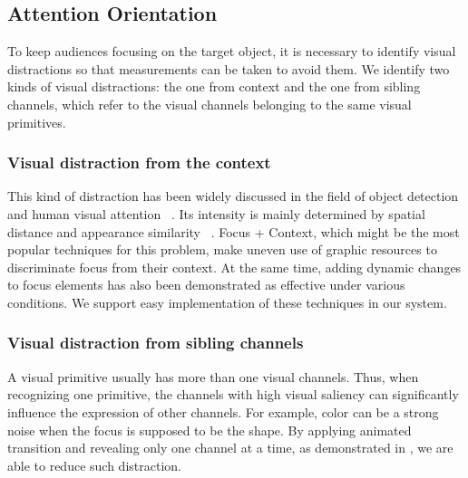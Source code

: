 \subsection{Attention Orientation}
To keep audiences focusing on the target object, it is necessary to identify visual distractions so that measurements can be taken to avoid them. 
We identify two kinds of visual distractions: the one from context and the one from sibling channels, which refer to the visual channels belonging to the same visual primitives. 

\subsubsection{Visual distraction from the context}
This kind of distraction has been widely discussed in the field of object detection and human visual attention ~\cite{nothdurft_salience_2000, standage_modelling_2005}. Its intensity is mainly  determined by spatial distance and appearance similarity ~\cite{wolfe_guided_1994}. 
Focus + Context, which might be the most popular techniques for this problem, make uneven use of graphic resources to discriminate focus from their context. At the same time, adding dynamic changes to focus elements has also been demonstrated as effective under various conditions\cite{waldner_attractive_2014}. We support easy implementation of these techniques in our system. 

\subsubsection{Visual distraction from sibling channels}
A visual primitive usually has more than one visual channels. Thus, when recognizing one primitive, the channels with high visual saliency can significantly influence the expression of other channels. For example, color can be a strong noise when the focus is supposed to be the shape. By applying animated transition and revealing only one channel at a time, as demonstrated in , we are able to reduce such distraction.



